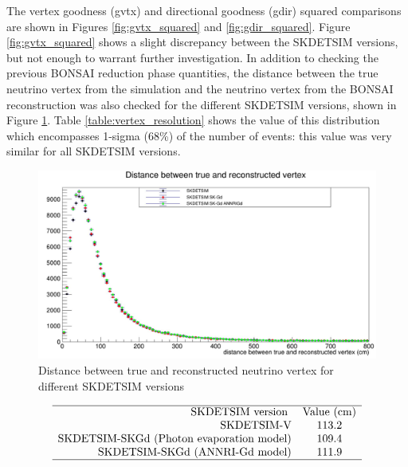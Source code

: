 The vertex goodness (gvtx) and directional goodness (gdir) squared comparisons are shown in Figures \ref{fig:gvtx_squared} and \ref{fig:gdir_squared}. Figure \ref{fig:gvtx_squared} shows a slight discrepancy between the SKDETSIM versions, but not enough to warrant further investigation. In addition to checking the previous BONSAI reduction phase quantities, the distance between the true neutrino vertex from the simulation and the neutrino vertex from the BONSAI reconstruction was also checked for the different SKDETSIM versions, shown in Figure \ref{fig:vertex_resolution}. Table \ref{table:vertex_resolution} shows the value of this distribution which encompasses 1-sigma (68\%) of the number of events: this value was very similar for all SKDETSIM versions.
\begin{figure}

    \includegraphics[width=\textwidth]{Figures/vertex_resolution.png}
    \caption{Distance between true and reconstructed neutrino vertex for different SKDETSIM versions}
    \label{fig:vertex_resolution}

\end{figure}

\begin{table}
    $$
    \begin{array}{rcc}
    \hline \text { SKDETSIM version } & \text{Value (cm)} \\
    \text{SKDETSIM-V} & 113.2\\
    \text{SKDETSIM-SKGd (Photon evaporation model)} & 109.4 \\
    \text{SKDETSIM-SKGd (ANNRI-Gd model)} & 111.9 \\
    \hline
    \end{array}
    $$
\caption{Value of the true neutrino vertex - reconstructed neutrino vertex distribution which encompasses 1-sigma (68\%) of the number of events.}
\label{table:vertex_resolution}
\end{table}

